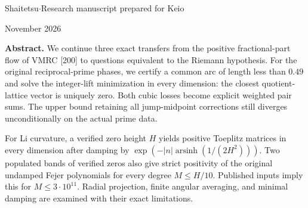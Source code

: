 \documentclass[11pt,a4paper]{article}
\theoremstyle{definition}\newtheorem{definition}[theorem]{Definition}
\theoremstyle{remark}\newtheorem{remark}[theorem]{Remark}
\numberwithin{equation}{section}
\begin{document}
\begin{titlepage}
\par
\vspace{9mm}
\vspace{5mm}
\par
\vspace{7mm}
\noindent Shaitetsu\quad$\cdot$\quad Research manuscript prepared for Keio\par
{} November 2026\par
\vspace{6mm}
\begingroup\small
\noindent\textbf{Abstract.}
We continue three exact transfers from the positive fractional-part
flow of VMRC [200] to questions equivalent to the Riemann hypothesis.
For the original reciprocal-prime phases, we certify a common arc
of length less than $0.49$ and solve the integer-lift minimization
in every dimension: the closest quotient-lattice vector is uniquely
zero. Both cubic losses become explicit weighted pair sums.
The upper bound retaining all jump-midpoint corrections still
diverges unconditionally on the actual prime data.

For Li curvature, a verified zero height $H$ yields positive
Toeplitz matrices in every dimension after damping by
$\exp(-|n|\operatorname{arsinh}(1/(2H^2)))$.
Two populated bands of verified zeros also give strict positivity
of the original undamped Fejer polynomials for every degree
$M\le H/10$. Published inputs imply this for $M\le3\cdot10^{11}$.
Radial projection, finite angular averaging, and minimal damping
are examined with their exact limitations.


\end{titlepage}
\end{document}
